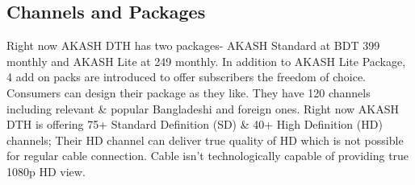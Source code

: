 \begin{spacing}{1.5}
\section{Channels and Packages}
Right now AKASH DTH has two packages- AKASH Standard at BDT 399 monthly and AKASH Lite at 249 monthly. In addition to AKASH Lite Package, 4 add on packs are introduced to offer subscribers the freedom of choice. Consumers can design their package as they like.
They have 120 channels including relevant \& popular Bangladeshi and foreign ones. 
Right now AKASH DTH is offering 75+ Standard Definition (SD) \& 40+ High Definition (HD) channels; Their HD channel can deliver true quality of HD which is not possible for regular cable connection. Cable isn't technologically capable of providing true 1080p HD view. 


\end{spacing}

\newpage
